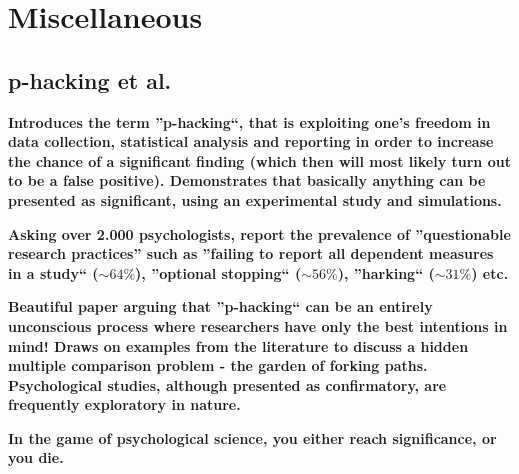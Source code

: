 \documentclass[12pt]{scrartcl}
\begin{document}
\section{Miscellaneous}

\subsection{p-hacking et al.}
\begin{description}
  \item {}
  
  \textbf{Introduces the term ''p-hacking``, that is exploiting one's freedom in data collection, statistical analysis and reporting in order to increase the chance of a significant finding (which then will most likely turn out to be a false positive). Demonstrates that basically anything can be presented as significant, using an experimental study and simulations.}
  
  \item {}
  
  \textbf{Asking over 2.000 psychologists, report the prevalence of ''questionable research practices'' such as ''failing to report all dependent measures in a study`` ($\sim 64\%$), ''optional stopping`` ($\sim 56\%$), ''harking`` ($\sim 31\%$) etc.}
  
  \item {}
  
  \textbf{Beautiful paper arguing that ''p-hacking`` can be an entirely unconscious process where researchers have only the best intentions in mind! Draws on examples from the literature to discuss a hidden multiple comparison problem - the garden of forking paths. Psychological studies, although presented as confirmatory, are frequently exploratory in nature.}
  
  \item {}
  
  \textbf{In the game of psychological science, you either reach significance, or you die.}
\end{description}
\end{document}
